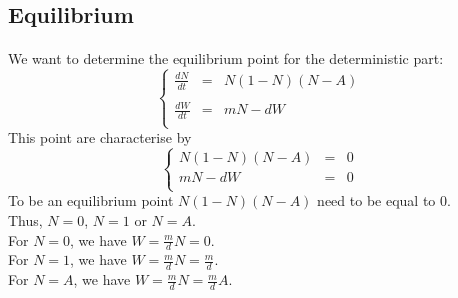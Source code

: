 \documentclass{article}
\begin{document}






\subsection{Equilibrium}
\label{equi}
\paragraph{}
We want to determine the equilibrium point for the deterministic part:
\[
\left\lbrace
\begin{array}{rcl}
\frac{dN}{dt} & = & N(1-N)(N-A) \\
\\
\frac{dW}{dt} & = & mN -dW \\
\end{array}
\right.
\]
This point are characterise by
\[
\left\lbrace
\begin{array}{rcl}
N(1-N)(N-A) & = & 0\\
mN -dW & = & 0\\
\end{array}
\right.
\]
To be an equilibrium point $N(1-N)(N-A)$ need to be equal to $0$. \\
Thus, $N = 0$, $N = 1$ or $N = A$. \\
For $N = 0$, we have $W = \frac{m}{d}N = 0$. \\
For $N = 1$, we have $W = \frac{m}{d}N = \frac{m}{d}$. \\
For $N = A$, we have $W = \frac{m}{d}N = \frac{m}{d}A$. \\
\end{document}

